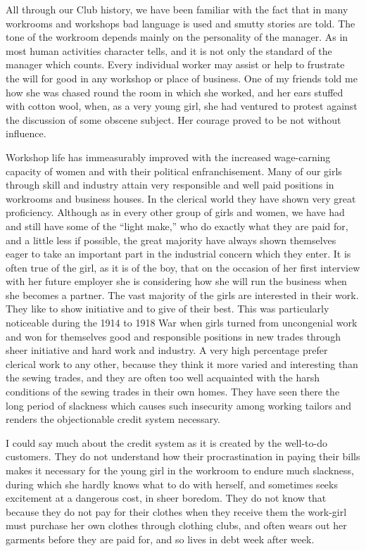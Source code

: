 All through our Club history, we have been familiar
with the fact that in many workrooms and workshops bad
language is used and smutty stories are told.
The tone of the workroom depends mainly on the
personality of the manager. As in most human activities
character tells, and it is not only the standard of the
manager which counts. Every individual worker may
assist or help to frustrate the will for good in any workshop
or place of business. One of my friends told me how
she was chased round the room in which she worked, and
her ears stuffed with cotton wool, when, as a very young
girl, she had ventured to protest against the discussion of
some obscene subject. Her courage proved to be not
without influence.

Workshop life has immeasurably improved with the
increased wage-carning capacity of women and with their
political enfranchisement. Many of our girls through
skill and industry attain very responsible and well paid
positions in workrooms and business houses. In the clerical
world they have shown very great proficiency. Although
as in every other group of girls and women, we have had
and still have some of the “light make,” who do exactly
what they are paid for, and a little less if possible, the
great majority have always shown themselves eager to
take an important part in the industrial concern which
they enter. It is often true of the girl, as it is of the boy,
that on the occasion of her first interview with her future
employer she is considering how she will run the business
when she becomes a partner. The vast majority of the
girls are interested in their work. They like to show
initiative and to give of their best. This was particularly
noticeable during the 1914 to 1918 War when girls turned
from uncongenial work and won for themselves good and
responsible positions in new trades through sheer
initiative and hard work and industry. A very high percentage
prefer clerical work to any other, because they think it
more varied and interesting than the sewing trades, and
they are often too well acquainted with the harsh
conditions of the sewing trades in their own homes. They
have seen there the long period of slackness which causes
such insecurity among working tailors and renders the
objectionable credit system necessary.

I could say much about the credit system as it is created
by the well-to-do customers. They do not understand
how their procrastination in paying their bills makes it
necessary for the young girl in the workroom to endure
much slackness, during which she hardly knows what to
do with herself, and sometimes seeks excitement at a
dangerous cost, in sheer boredom. They do not know that
because they do not pay for their clothes when they
receive them the work-girl must purchase her own clothes
through clothing clubs, and often wears out her garments
before they are paid for, and so lives in debt week after
week.

